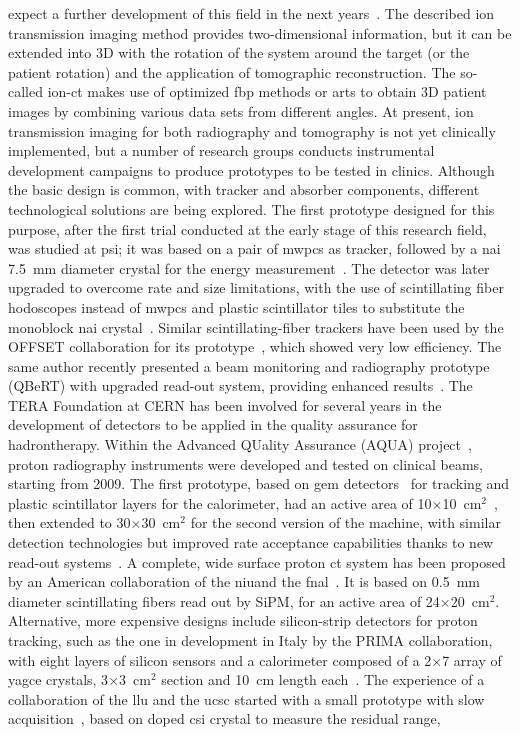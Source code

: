 expect a further development of this field in the next years~\parencite{Parodi2014}.
The described ion transmission imaging method provides two-dimensional information, but it can be extended into 3D with the rotation of the system around the target (or the patient rotation) and the application of tomographic reconstruction. The so-called ion-\gls{ct} makes use of optimized \gls{fbp} methods or \glspl{art} to obtain 3D patient images by combining various data sets from different angles.
At present, ion transmission imaging for both radiography and tomography is not yet clinically implemented, but a number of research groups conducts instrumental development campaigns to produce prototypes to be tested in clinics. Although the basic design is common, with tracker and absorber components, different technological solutions are being explored. The first prototype designed for this purpose, after the first trial conducted at the early stage of this research field, was studied at \gls{psi}; it was based on a pair of \glspl{mwpc} as tracker, followed by a \gls{nai} 7.5~mm diameter crystal for the energy measurement~\parencite{Schneider1995}. The detector was later upgraded to overcome rate and size limitations, with the use of scintillating fiber hodoscopes instead of \glspl{mwpc} and plastic scintillator tiles to substitute the monoblock \gls{nai} crystal~\parencite{Pemler1999}. Similar scintillating-fiber trackers have been used by the OFFSET collaboration for its prototype~\parencite{Lopresti2014}, which showed very low efficiency. The same author recently presented a beam monitoring and radiography prototype (QBeRT) with upgraded read-out system, providing enhanced results~\parencite{Lopresti2016, Gallo2016}. The TERA Foundation at CERN has been involved for several years in the development of detectors to be applied in the quality assurance for hadrontherapy. Within the Advanced QUality Assurance (AQUA) project~\parencite{Amaldi2010b}, proton radiography instruments were developed and tested on clinical beams, starting from 2009. The first prototype, based on \gls{gem} detectors~\parencite{Sauli1997} for tracking and plastic scintillator layers for the calorimeter, had an active area of 10$\times$10~cm$^2$~\parencite{Amaldi2011}, then extended to 30$\times$30~cm$^2$ for the second version of the machine, with similar detection technologies but improved rate acceptance capabilities thanks to new read-out systems~\parencite{Bucciantonio2013, BucciantonioPhD2015}. A complete, wide surface proton \gls{ct} system has been proposed by an American collaboration of the \gls{niu}and the \gls{fnal}~\parencite{Naimuddin2016}. It is based on 0.5~mm diameter scintillating fibers read out by SiPM, for an active area of 24$\times$20~cm$^2$. Alternative, more expensive designs include silicon-strip detectors for proton tracking, such as the one in development in Italy by the PRIMA collaboration, with eight layers of silicon sensors and a calorimeter composed of a 2$\times$7 array of \gls{yagce} crystals, 3$\times$3~cm$^2$ section and 10~cm length each~\parencite{Scaringella2013}. The experience of a collaboration of the \gls{llu} and the \gls{ucsc} started with a small prototype with slow acquisition~\parencite{Sadrozinsky2011}, based on doped \gls{csi} crystal to measure the residual range, 